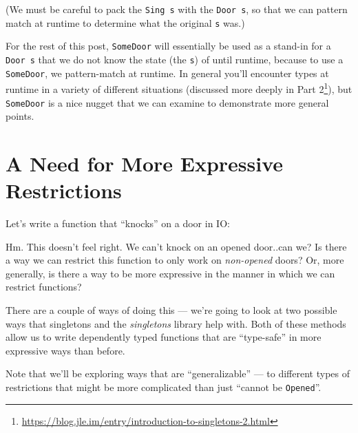 \documentclass[]{article}
\newenvironment{Shaded}{}{}
\newcommand{\DataTypeTok}[1]{\textcolor[rgb]{0.56,0.13,0.00}{#1}}
\newcommand{\FunctionTok}[1]{\textcolor[rgb]{0.02,0.16,0.49}{#1}}
\newcommand{\NormalTok}[1]{#1}
\newcommand{\OtherTok}[1]{\textcolor[rgb]{0.00,0.44,0.13}{#1}}
\newcommand{\StringTok}[1]{\textcolor[rgb]{0.25,0.44,0.63}{#1}}
\renewcommand{\href}[2]{#2\footnote{\url{#1}}}
\begin{document}
(We must be careful to pack the \texttt{Sing\ s} with the \texttt{Door\ s}, so
that we can pattern match at runtime to determine what the original \texttt{s}
was.)

For the rest of this post, \texttt{SomeDoor} will essentially be used as a
stand-in for a \texttt{Door\ s} that we do not know the state (the \texttt{s})
of until runtime, because to use a \texttt{SomeDoor}, we pattern-match at
runtime. In general you'll encounter types at runtime in a variety of different
situations (discussed more deeply in
\href{https://blog.jle.im/entry/introduction-to-singletons-2.html}{Part 2}), but
\texttt{SomeDoor} is a nice nugget that we can examine to demonstrate more
general points.

\hypertarget{a-need-for-more-expressive-restrictions}{%
\section{A Need for More Expressive
Restrictions}\label{a-need-for-more-expressive-restrictions}}

Let's write a function that ``knocks'' on a door in IO:

\begin{Shaded}
\end{Shaded}

Hm. This doesn't feel right. We can't knock on an opened door..can we? Is there
a way we can restrict this function to only work on \emph{non-opened} doors? Or,
more generally, is there a way to be more expressive in the manner in which we
can restrict functions?

There are a couple of ways of doing this --- we're going to look at two possible
ways that singletons and the \emph{singletons} library help with. Both of these
methods allow us to write dependently typed functions that are ``type-safe'' in
more expressive ways than before.

Note that we'll be exploring ways that are ``generalizable'' --- to different
types of restrictions that might be more complicated than just ``cannot be
\texttt{\textquotesingle{}Opened}''.
\end{document}
